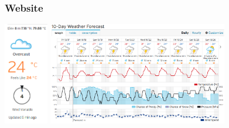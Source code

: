 \documentclass[serif,mathserif]{beamer}
\begin{document}
\begin{frame}
  \frametitle{Website}
  \begin{center}
  \includegraphics[height=4.5cm]{wu_banner}
  \hspace{1mm}
  \includegraphics[height=4.5cm]{wundergound}
  \end{center}
\end{frame}

\end{document}
